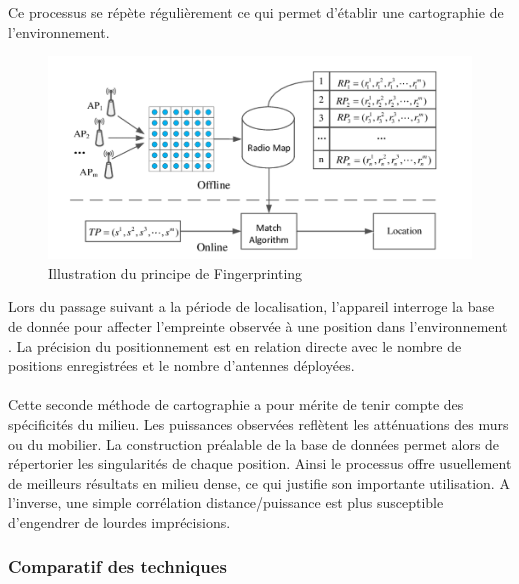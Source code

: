 \documentclass[12pt,a4paper]{report}
\begin{document}
\begin{itemize}
\begin{figure}[H]
 	
 	
 \end{figure}

Ce processus se répète régulièrement ce qui permet d’établir une  cartographie de l'environnement.
 \begin{figure}[H]
 	\centering
 	\includegraphics[width=1.1\linewidth]{Pics/sysRss2.PNG}
 	\caption{Illustration du principe de Fingerprinting}
 	\label{fig:sysRss2}
 	
 	
 \end{figure}

Lors du passage suivant a la période de localisation, l’appareil interroge la base de donnée pour affecter l’empreinte observée à une position dans l’environnement . 
La précision du positionnement est en relation directe avec le nombre de positions enregistrées et le nombre d'antennes déployées.





\paragraph{}
Cette seconde méthode de cartographie a pour mérite de tenir compte des spécificités du milieu. Les puissances observées reflètent les atténuations des murs ou du mobilier. La construction préalable de la base de données permet alors de répertorier les singularités de chaque position.	Ainsi le processus offre usuellement de meilleurs résultats en milieu dense, ce qui justifie son importante utilisation. A l’inverse, une simple corrélation distance/puissance est plus susceptible d’engendrer de lourdes imprécisions.



\subsubsection{Comparatif des techniques}


\end{itemize}
\end{document}
